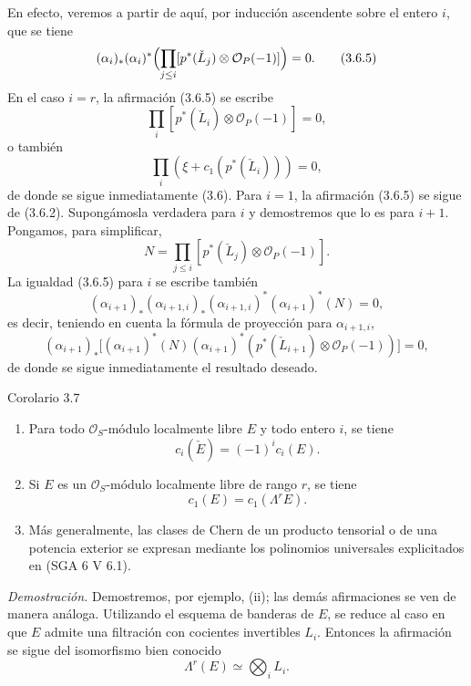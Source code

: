 En efecto, veremos a partir de aquí, por inducción ascendente sobre el entero $i$, que se tiene
\[
(\alpha_i)_*(\alpha_i)^*\Bigl(\prod_{j\le i}[p^*(\check L_j)\otimes\mathcal O_P(-1)]\Bigr)=0.
\tag{3.6.5}
\]
En el caso $i=r$, la afirmación (3.6.5) se escribe
\[
\prod_i[p^*(\check L_i)\otimes\mathcal O_P(-1)]=0,
\]
o también
\[
\prod_i(\xi+c_1(p^*(\check L_i)))=0,
\]
de donde se sigue inmediatamente (3.6). Para $i=1$, la afirmación (3.6.5) se sigue de (3.6.2). Supongámosla verdadera para $i$ y demostremos que lo es para $i+1$. Pongamos, para simplificar,
\[
N=\prod_{j\le i}[p^*(\check L_j)\otimes\mathcal O_P(-1)].
\]
La igualdad (3.6.5) para $i$ se escribe también
\[
(\alpha_{i+1})_*(\alpha_{i+1,i})_*(\alpha_{i+1,i})^*(\alpha_{i+1})^*(N)=0,
\]
es decir, teniendo en cuenta la fórmula de proyección para $\alpha_{i+1,i}$,
\[
(\alpha_{i+1})_*\bigl[(\alpha_{i+1})^*(N)(\alpha_{i+1})^*(p^*(\check L_{i+1})\otimes\mathcal O_P(-1))\bigr]=0,
\]
de donde se sigue inmediatamente el resultado deseado.

\begin{statement}{Corolario 3.7}
\begin{enumerate}[label=(\roman*)]
\item Para todo $\mathcal O_S$-módulo localmente libre $E$ y todo entero $i$, se tiene
\[
c_i(\check E)=(-1)^i c_i(E).
\]
\item Si $E$ es un $\mathcal O_S$-módulo localmente libre de rango $r$, se tiene
\[
c_1(E)=c_1(\Lambda^rE).
\]
\item Más generalmente, las clases de Chern de un producto tensorial o de una potencia exterior se expresan mediante los polinomios universales explicitados en (SGA 6 V 6.1).
\end{enumerate}
\end{statement}

\emph{Demostración.} Demostremos, por ejemplo, (ii); las demás afirmaciones se ven de manera análoga. Utilizando el esquema de banderas de $E$, se reduce al caso en que $E$ admite una filtración con cocientes invertibles $L_i$. Entonces la afirmación se sigue del isomorfismo bien conocido
\[
\Lambda^r(E)\simeq\bigotimes_i L_i.
\]
